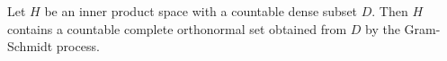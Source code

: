 Let $H$ be an inner product space with a countable dense subset $D$. Then $H$ contains a countable complete orthonormal set obtained from $D$ by the Gram-Schmidt process.
